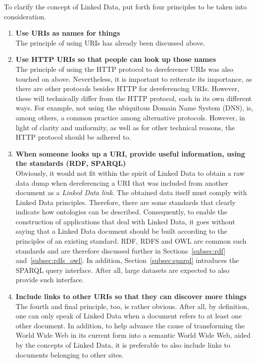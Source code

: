 To clarify the concept of Linked Data, \citet{berners2006linked} put forth four principles to be taken into consideration.
\begin{enumerate}

    \item \textbf{Use URIs as names for things}\\
    The principle of using URIs has already been discussed above.
    
    \item \textbf{Use HTTP URIs so that people can look up those names}\\
    The principle of using the HTTP protocol to dereference URIs was also touched on above. Nevertheless, it is important to reiterate its importance, as there are other protocols besides HTTP for dereferencing URIs. However, these will technically differ from the HTTP protocol, each in its own different ways. For example, not using the ubiquitous Domain Name System (DNS), is, among others, a common practice among alternative protocols. However, in light of clarity and uniformity, as well as for other technical reasons, the HTTP protocol should be adhered to. \citep{berners2006linked}
    
    \item \textbf{When someone looks up a URI, provide useful information, using the standards (RDF, SPARQL)}\\
    Obviously, it would not fit within the spirit of Linked Data to obtain a raw data dump when dereferencing a URI that was included from another document as a \textit{Linked Data link}. The obtained data itself must comply with Linked Data principles. Therefore, there are some standards that clearly indicate how ontologies can be described. Consequently, to enable the construction of applications that deal with Linked Data, it goes without saying that a Linked Data document should be built according to the principles of an existing standard. RDF, RDFS and OWL are common such standards and are therefore discussed further in Sections~\ref{subsec:rdf} and~\ref{subsec:rdfs_owl}. In addition, Section~\ref{subsec:sparql} introduces the SPARQL query interface. After all, large datasets are expected to also provide such interface. \citep{berners2006linked}
    
    \item \textbf{Include links to other URIs so that they can discover more things}\\
    The fourth and final principle, too, is rather obvious. After all, by definition, one can only speak of Linked Data when a document refers to at least one other document. In addition, to help advance the cause of transforming the World Wide Web in its current form into a semantic World Wide Web, aided by the concepts of Linked Data, it is preferable to also include links to documents belonging to other sites. \citep{berners2006linked}
    
\end{enumerate}

